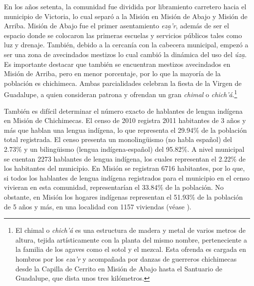 \documentclass[output=paper]{../langscibook}
\begin{document}
En los años setenta, la comunidad fue dividida por libramiento carretero hacia el municipio de Victoria, lo cual separó a la Misión en Misión de Abajo y Misión de Arriba. Misión de Abajo fue el primer asentamiento \textit{eza̱’r}, además de ser el espacio donde se colocaron las primeras escuelas y servicios públicos tales como luz y drenaje. También, debido a la cercanía con la cabecera municipal, empezó a ser una zona de avecindados mestizos lo cual cambió la dinámica del uso del \textit{úza̱}. Es importante destacar que también se encuentran mestizos avecindados en Misión de Arriba, pero en menor porcentaje, por lo que la mayoría de la población es chichimeca. Ambas parcialidades celebran la fiesta de la Virgen de Guadalupe, a quien consideran patrona y ofrendan un gran \textit{chimal} o \textit{chich’á}.\footnote{El chimal o \textit{chich’á} es una estructura de madera y metal de varios metros de altura, tejida artísticamente con la planta del mismo nombre, perteneciente a la familia de los agaves como el sotol y el mezcal. Esta ofrenda es cargada en hombros por los \textit{eza’r} y acompañada por danzas de guerreros chichimecas desde la Capilla de Cerrito en Misión de Abajo hasta el Santuario de Guadalupe, que dista unos tres kilómetros.}

También es difícil determinar el número exacto de hablantes de lengua indígena en Misión de Chichimecas. El censo de 2010 registra 2011 habitantes de 3 años y más que hablan una lengua indígena, lo que representa el 29.94\% de la población total registrada. El censo presenta un monolingüismo (no habla español) del 2.73\% y un bilingüismo (lengua indígena-español) del 95.82\%. A nivel municipal se cuentan 2273 hablantes de lengua indígena, los cuales representan el 2.22\% de los habitantes del municipio. En Misión se registran 6716 habitantes, por lo que, si todos los hablantes de lengua indígena registrados para el municipio en el censo vivieran en esta comunidad, representarían el 33.84\% de la población. No obstante, en Misión los hogares indígenas representan el 51.93\% de la población de 5 años y más, en una localidad con 1157 viviendas (véase ).
\end{document}
